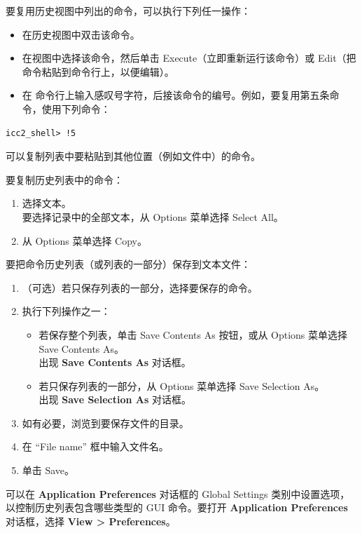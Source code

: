 要复用历史视图中列出的命令，可以执行下列任一操作：
\begin{itemize}
  \item 在历史视图中双击该命令。
  \item 在视图中选择该命令，然后单击 Execute（立即重新运行该命令）或 Edit（把命令粘贴到命令行上，以便编辑）。
  \item 在  命令行上输入感叹号字符，后接该命令的编号。例如，要复用第五条命令，使用下列命令：
\end{itemize}
\begin{lstlisting}
icc2_shell> !5
\end{lstlisting}

可以复制列表中要粘贴到其他位置（例如文件中）的命令。

要复制历史列表中的命令：
\begin{enumerate}
  \item 选择文本。\\
        要选择记录中的全部文本，从 Options 菜单选择 Select All。
  \item 从 Options 菜单选择 Copy。
\end{enumerate}

要把命令历史列表（或列表的一部分）保存到文本文件：
\begin{enumerate}
  \item （可选）若只保存列表的一部分，选择要保存的命令。
  \item 执行下列操作之一：
  \begin{itemize}
    \item 若保存整个列表，单击 Save Contents As 按钮，或从 Options 菜单选择 Save Contents As。\\
          出现 \textbf{Save Contents As} 对话框。
    \item 若只保存列表的一部分，从 Options 菜单选择 Save Selection As。\\
          出现 \textbf{Save Selection As} 对话框。
  \end{itemize}
  \item 如有必要，浏览到要保存文件的目录。
  \item 在 “File name” 框中输入文件名。
  \item 单击 Save。
\end{enumerate}

可以在 \textbf{Application Preferences} 对话框的 Global Settings 类别中设置选项，以控制历史列表包含哪些类型的 GUI 命令。要打开 \textbf{Application Preferences} 对话框，选择 \textbf{View > Preferences}。

